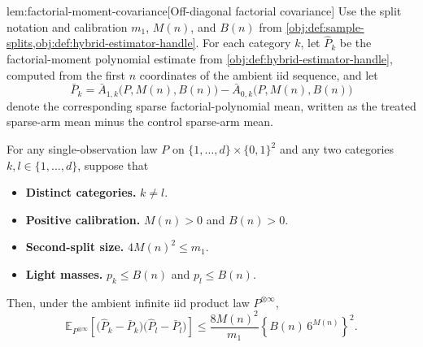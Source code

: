 \documentclass[11pt]{article}
\begin{document}
\begin{lemmav}{lem:factorial-moment-covariance}[Off-diagonal factorial covariance]
Use the split notation and calibration \(m_1\), \(M(n)\), and \(B(n)\) from \cref{obj:def:sample-splits,obj:def:hybrid-estimator-handle}.  For each category \(k\), let \(\widehat P_k\) be the factorial-moment polynomial estimate from \cref{obj:def:hybrid-estimator-handle}, computed from the first \(n\) coordinates of the ambient iid sequence, and let
\[
\bar P_k
=
\bar A_{1,k}\bigl(P,M(n),B(n)\bigr)
-
\bar A_{0,k}\bigl(P,M(n),B(n)\bigr)
\]
denote the corresponding sparse factorial-polynomial mean, written as the treated sparse-arm mean minus the control sparse-arm mean.

For any single-observation law \(P\) on \(\{1,\ldots,d\}\times\{0,1\}^2\) and any two categories \(k,l\in\{1,\ldots,d\}\), suppose that
\begin{itemize}
\item \textbf{Distinct categories.} \(k\ne l\).
\item \textbf{Positive calibration.} \(M(n)>0\) and \(B(n)>0\).
\item \textbf{Second-split size.} \(4M(n)^2\le m_1\).
\item \textbf{Light masses.} \(p_k\le B(n)\) and \(p_l\le B(n)\).
\end{itemize}
Then, under the ambient infinite iid product law \(P^{\otimes\infty}\),
\[
\mathbb E_{P^{\otimes\infty}}
\!\left[
\bigl(\widehat P_k-\bar P_k\bigr)
\bigl(\widehat P_l-\bar P_l\bigr)
\right]
\le
\frac{8M(n)^2}{m_1}
\left\{B(n)\,6^{M(n)}\right\}^2 .
\]
\end{lemmav}
\end{document}
